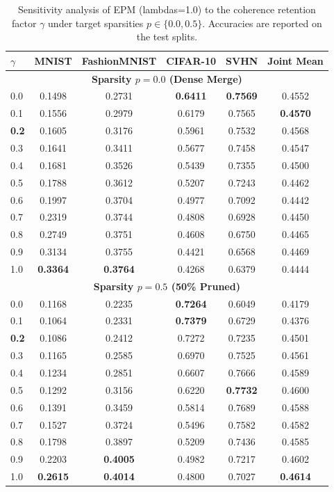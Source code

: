 \begin{table}[htbp]
\caption{Sensitivity analysis of EPM (lambdas=1.0) to the coherence retention factor $\gamma$ under target sparsities $p \in \{0.0, 0.5\}$. Accuracies are reported on the test splits.}
\label{tab:gamma_sensitivity}
\vskip 0.15in
\begin{center}
\begin{small}
\begin{sc}
\begin{tabular}{lccccc}
\toprule
$\gamma$ & MNIST & FashionMNIST & CIFAR-10 & SVHN & Joint Mean \\
\midrule
\multicolumn{6}{c}{\textbf{Sparsity $p = 0.0$ (Dense Merge)}} \\
\midrule
0.0 & 0.1498 & 0.2731 & \textbf{0.6411} & \textbf{0.7569} & 0.4552 \\
0.1 & 0.1556 & 0.2979 & 0.6179 & 0.7565 & \textbf{0.4570} \\
\textbf{0.2} & 0.1605 & 0.3176 & 0.5961 & 0.7532 & 0.4568 \\
0.3 & 0.1641 & 0.3411 & 0.5677 & 0.7458 & 0.4547 \\
0.4 & 0.1681 & 0.3526 & 0.5439 & 0.7355 & 0.4500 \\
0.5 & 0.1788 & 0.3612 & 0.5207 & 0.7243 & 0.4462 \\
0.6 & 0.1997 & 0.3704 & 0.4977 & 0.7092 & 0.4442 \\
0.7 & 0.2319 & 0.3744 & 0.4808 & 0.6928 & 0.4450 \\
0.8 & 0.2749 & 0.3751 & 0.4608 & 0.6750 & 0.4465 \\
0.9 & 0.3134 & 0.3755 & 0.4421 & 0.6568 & 0.4469 \\
1.0 & \textbf{0.3364} & \textbf{0.3764} & 0.4268 & 0.6379 & 0.4444 \\
\midrule
\multicolumn{6}{c}{\textbf{Sparsity $p = 0.5$ (50\% Pruned)}} \\
\midrule
0.0 & 0.1168 & 0.2235 & \textbf{0.7264} & 0.6049 & 0.4179 \\
0.1 & 0.1064 & 0.2331 & \textbf{0.7379} & 0.6729 & 0.4376 \\
\textbf{0.2} & 0.1086 & 0.2412 & 0.7272 & 0.7235 & 0.4501 \\
0.3 & 0.1165 & 0.2585 & 0.6970 & 0.7525 & 0.4561 \\
0.4 & 0.1234 & 0.2851 & 0.6607 & 0.7666 & 0.4589 \\
0.5 & 0.1292 & 0.3156 & 0.6220 & \textbf{0.7732} & 0.4600 \\
0.6 & 0.1391 & 0.3459 & 0.5814 & 0.7689 & 0.4588 \\
0.7 & 0.1527 & 0.3724 & 0.5496 & 0.7582 & 0.4582 \\
0.8 & 0.1798 & 0.3897 & 0.5209 & 0.7436 & 0.4585 \\
0.9 & 0.2203 & \textbf{0.4005} & 0.4982 & 0.7217 & 0.4602 \\
1.0 & \textbf{0.2615} & \textbf{0.4014} & 0.4800 & 0.7027 & \textbf{0.4614} \\
\bottomrule
\end{tabular}
\end{sc}
\end{small}
\end{center}
\vskip -0.1in
\end{table}


